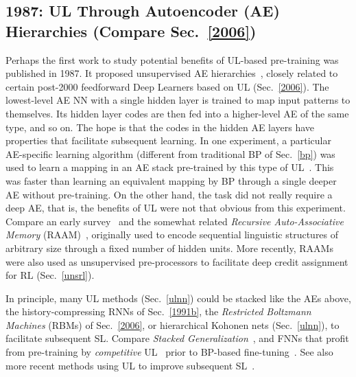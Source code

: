 \documentclass[letterpaper]{article}
\begin{document}
\begin{CJK*}{UTF8}{gbsn}
\begin{sloppypar}
\subsection{1987: UL Through Autoencoder (AE) Hierarchies (Compare Sec.~\ref{2006})}
\label{1987}

Perhaps the first work to study
 potential benefits of UL-based pre-training was published in 1987.
It proposed unsupervised AE hierarchies~\citep{ballard1987modular}, 
closely related to certain 
post-2000 feedforward Deep Learners based on UL (Sec.~\ref{2006}).
The lowest-level AE NN with a single hidden layer is trained to map input patterns to themselves. Its hidden layer codes are then fed into a higher-level AE of the same type, and so on. The hope is that the codes in the hidden AE layers have properties that facilitate subsequent learning. 
In one experiment, a particular AE-specific learning algorithm (different from traditional  BP of Sec.~\ref{bp}) was used to
learn a mapping in an AE stack pre-trained by this type of UL~\citep{ballard1987modular}. This was faster than 
learning an equivalent mapping by BP through a single deeper AE without pre-training. 
On the other hand, the task did not really require a deep AE, that is, the benefits of UL were not that obvious from this experiment.
Compare an early survey~\citep{hinton1989connectionist} and the somewhat 
related {\em Recursive Auto-Associative Memory} (RAAM)~\citep{pollack1988implications,Pollack:90,Melnik2000},
originally used to encode sequential linguistic structures of arbitrary size 
through a fixed number of hidden units.
More recently, RAAMs were also used as unsupervised pre-processors
to facilitate deep credit assignment for RL \citep{Gisslen2011agi} (Sec.~\ref{unsrl}).

In principle, many UL methods (Sec.~\ref{ulnn}) could be stacked like the  
AEs above,
the  history-compressing RNNs of Sec.~\ref{1991b},
the {\em Restricted Boltzmann Machines} (RBMs) of Sec.~\ref{2006},
or hierarchical Kohonen nets (Sec.~\ref{ulnn}),
to facilitate subsequent SL.
Compare {\em Stacked Generalization}~\citep{wolpert:92stacked,ting1997},
and FNNs that profit from pre-training by {\em competitive} UL~\citep[e.g.,][]{RumelhartZipser:86}
prior to BP-based fine-tuning~\citep{maclin1995}.
See also more recent methods using UL to improve subsequent SL~\citep[e.g.,][]{Behnke:IJCNN1999,Behnke:IJCNN2003,wiskott2013}.



\end{sloppypar}
\end{CJK*}
\end{document}
